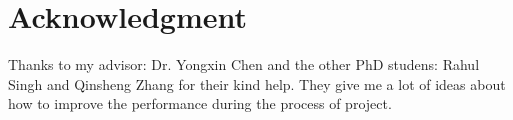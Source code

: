 \documentclass[conference,compsoc]{IEEEtran}
\begin{document}
\section*{Acknowledgment}

Thanks to my advisor: Dr. Yongxin Chen and the other PhD studens: Rahul Singh and Qinsheng Zhang for their kind help. They give me a lot of ideas about how to improve the performance during the process of project.



\end{document}

